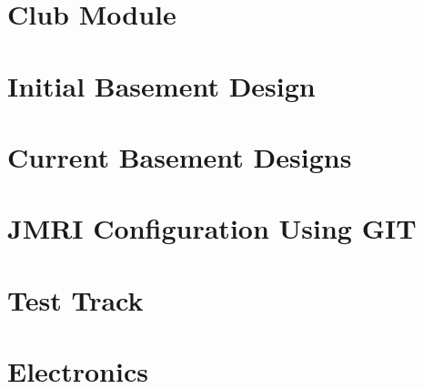 \documentclass[12pt,twoside]{book}
\begin{document}
\frontmatter
\pagestyle{empty}


\dominitoc
\tableofcontents
\listoftables
\listoffigures

\mainmatter
\pagestyle{protocol}
\part{Club Module}



\part{Initial Basement Design}


\part{Current Basement Designs}


\part{JMRI Configuration Using GIT}


\part{Test Track}


\part{Electronics}




\backmatter
{}
\footnotesize
\printindex
\normalsize
{}
\end{document}
